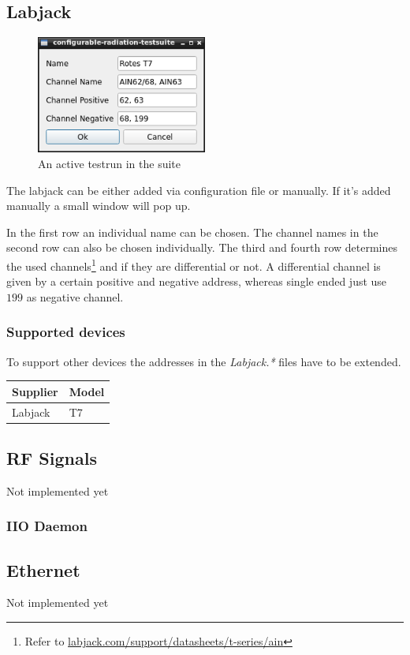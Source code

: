 \documentclass[10pt,a4paper]{article}
\begin{document}
	\subsection{Labjack}
	
	\begin{figure}[H]
	\centering
	\includegraphics[width=0.5\textwidth]{./3_LBJ_menu.png}
	\caption{An active testrun in the suite}
	\end{figure}
	
	The labjack can be either added via configuration file or manually. If it's added manually a small window will pop up.
	
	In the first row an individual name can be chosen. The channel names in the second row can also be chosen individually. The third and fourth row determines the used channels\footnote{Refer to \url{labjack.com/support/datasheets/t-series/ain}} and if they are differential or not. A differential channel is given by a certain positive and negative address, whereas single ended just use $199$ as negative channel.
	
	
		\subsubsection{Supported devices}
		To support other devices the addresses in the \textit{Labjack.*} files have to be extended.
	
		\begin{table}[H]
		\centering
		\begin{tabular}{ll}
		\toprule
		Supplier			& Model \\ \midrule
		Labjack				& T7 \\
		\bottomrule
		\end{tabular}			
		\end{table}	

	\subsection{RF Signals}
	Not implemented yet
	
		\subsubsection{IIO Daemon}
		
	\subsection{Ethernet}
	Not implemented yet
	
\end{document}
